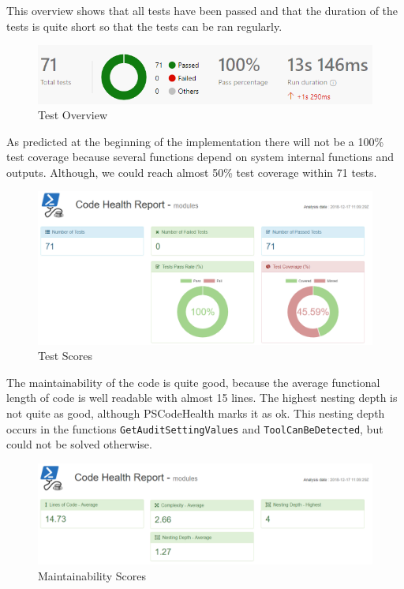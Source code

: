 \thispagestyle{plain}
\renewcommand\section{\stdsection}

This overview shows that all tests have been passed and that the duration of the tests is quite short so that the tests can be ran regularly.
\begin{figure}[H]
    \centering
    \includegraphics[width=1\linewidth]{assets/metrics/test_passing.png}
    \caption{Test Overview}
\end{figure}


As predicted at the beginning of the implementation there will not be a 100\% test coverage because several functions depend on system internal functions and outputs. Although, we could reach almost 50\% test coverage within 71 tests.
\begin{figure}[H]
    \centering
    \includegraphics[width=1\linewidth]{assets/metrics/tests.png}
    \caption{Test Scores}
\end{figure}

The maintainability of the code is quite good, because the average functional length of code is well readable with almost 15 lines. The highest nesting depth is not quite as good, although PSCodeHealth marks it as ok. This nesting depth occurs in the functions \lstinline|GetAuditSettingValues| and \lstinline|ToolCanBeDetected|, but could not be solved otherwise.  
\begin{figure}[H]
    \centering
    \includegraphics[width=1\linewidth]{assets/metrics/maintainability.png}
    \caption{Maintainability Scores}
\end{figure}